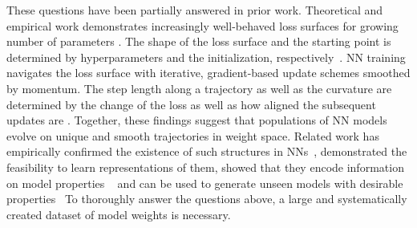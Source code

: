 These questions have been partially answered in prior work.
Theoretical and empirical work demonstrates increasingly well-behaved loss surfaces for growing number of parameters \citep{goodfellowQualitativelyCharacterizingNeural2015,dauphinMetaInitInitializingLearning2019,liVisualizingLossLandscape2018}. The shape of the loss surface and the starting point is determined by hyperparameters and the initialization, respectively~\citep{liVisualizingLossLandscape2018}. NN training navigates the loss surface with iterative, gradient-based update schemes smoothed by momentum. The step length along a trajectory as well as the curvature are determined by the change of the loss as well as how aligned the subsequent updates are \citep{cazenavetteDatasetDistillationMatching2022,schurholtInvestigationWeightSpace2021}. Together, these findings suggest that populations of NN models evolve on unique and smooth trajectories in weight space.
Related work has empirically confirmed the existence of such structures in NNs~\citep{denilPredictingParametersDeep2013}, demonstrated the feasibility to learn representations of them, showed that they encode information on model properties ~\citep{unterthinerPredictingNeuralNetwork2020,eilertsenClassifyingClassifierDissecting2020,schurholtSelfSupervisedRepresentationLearning2021} and can be used to generate unseen models with desirable properties~\citep{schurholtHyperRepresentationsPreTrainingTransfer2022,schurholtHyperRepresentationsGenerativeModels2022,zhmoginovHyperTransformerModelGeneration2022,knyazevParameterPredictionUnseen2021}
%
%
%
To thoroughly answer the questions above, a large and systematically created dataset of model weights is necessary. 

